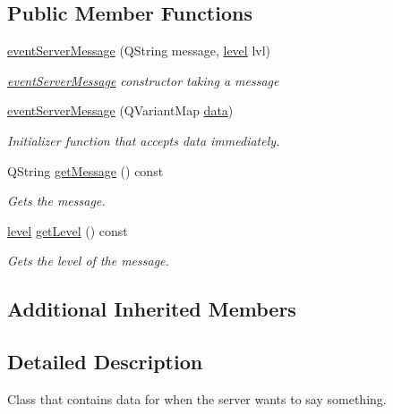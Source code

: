 \subsection*{Public Member Functions}
\begin{DoxyCompactItemize}
\item 
\hyperlink{classshared_1_1events_1_1event_server_message_ae12d1373b82828c26fe2e74439dd60eb}{event\-Server\-Message} (Q\-String message, \hyperlink{namespaceshared_ac45ebac56812e48d57e16c9cf057a1db}{level} lvl)
\begin{DoxyCompactList}\small\item\em \hyperlink{classshared_1_1events_1_1event_server_message}{event\-Server\-Message} constructor taking a message \end{DoxyCompactList}\item 
\hyperlink{classshared_1_1events_1_1event_server_message_ad2b4e273b5d1de7761aa751b9337d1f5}{event\-Server\-Message} (Q\-Variant\-Map \hyperlink{classshared_1_1events_1_1cls_event_a6cfb6b96d72fc1e7a101e61061ec2755}{data})
\begin{DoxyCompactList}\small\item\em Initializer function that accepts data immediately. \end{DoxyCompactList}\item 
Q\-String \hyperlink{classshared_1_1events_1_1event_server_message_a8d893e8dbb1289d2552a3a48d1323edd}{get\-Message} () const 
\begin{DoxyCompactList}\small\item\em Gets the message. \end{DoxyCompactList}\item 
\hyperlink{namespaceshared_ac45ebac56812e48d57e16c9cf057a1db}{level} \hyperlink{classshared_1_1events_1_1event_server_message_a578aacc79570f1c7302c6c69be564ac1}{get\-Level} () const 
\begin{DoxyCompactList}\small\item\em Gets the level of the message. \end{DoxyCompactList}\end{DoxyCompactItemize}
\subsection*{Additional Inherited Members}


\subsection{Detailed Description}
Class that contains data for when the server wants to say something. 

